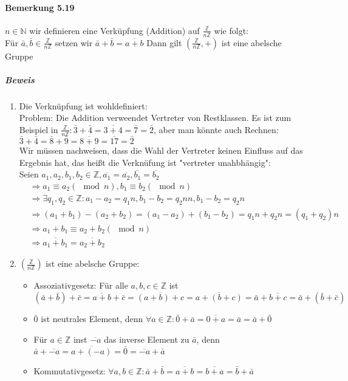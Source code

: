 \documentclass[a4paper]{scrartcl}
\DeclareMathOperator{\Forall}{\forall}
\begin{document}
\paragraph{Bemerkung 5.19}
\label{sec-3-1-7-4}
$n\in\mathbb{N}$ wir definieren eine Verküpfung (Addition) auf $\frac{\mathbb{Z}}{n\mathbb{Z}}$ wie folgt: \\
     Für $\bar a,\bar b \in\frac{\mathbb{Z}}{n\mathbb{Z}}$ setzen wir $\bar a + \bar b = \overline{a + b}$
Dann gilt $(\frac{\mathbb{Z}}{n\mathbb{Z}},+)$ ist eine abelsche Gruppe
\subparagraph{Beweis}
\label{sec-3-1-7-4-1}
\begin{enumerate}
\item Die Verknüpfung ist wohldefiniert: \\ Problem: Die Addition verweendet Vertreter von Restklassen. Es ist zum Beispiel in $\frac{\mathbb{Z}}{n\mathbb{Z}}: \bar 3 + \bar 4 = \overline{3 + 4} = \bar 7 = \bar 2$, aber man könnte auch Rechnen:
$\bar 3 + \bar 4 = \bar 8 + \bar 9 = \overline{8 + 9} = \overline{17} = \bar 2$ \\
         Wir müssen nachweisen, dass die Wahl der Vertreter keinen Einfluss auf das Ergebnis hat, das heißt die Verknüfung ist "vertreter unahbhängig": \\
         Seien $a_1,a_2 ,b_1,b_2 \in\mathbb{Z},\overline{a_1} = \overline{a_2},\overline{b_1} = \overline{b_2}$
\begin{align}
&\Rightarrow a_1 \equiv a_2(\mod n), b_1 \equiv b_2(\mod n) \\
&\Rightarrow\exists q_1,q_2\in\mathbb{Z}: a_1 - a_2 = q_1 n, b_1 - b_2 = q_2 n n, b_1 - b_2 = q_2 n \\
&\Rightarrow (a_1 + b_1) - (a_2 + b_2) = (a_1 - a_2)+ (b_1 - b_2) = q_1 n + q_2 n = (q_1 + q_2) n \\
&\Rightarrow a_1 + b_ 1 \equiv a_2 + b_2 (\mod n) \\
&\Rightarrow \overline{a_1 + b_1} = \overline{a_2 + b_2}
\end{align}
\item $(\frac{\mathbb{Z}}{n\mathbb{Z}})$ ist eine abelsche Gruppe:
\begin{itemize}
\item Assoziativgesetz: Für alle $a,b,c\in\mathbb{Z}$ ist
\[(\bar a + \bar b) + \bar c = \overline{a + b} + \bar c = \overline{(a + b) + c} = \overline{a + (b + c)} = \bar a + \overline{b + c} = \bar a + (\bar b + \bar c)\]
\item $\bar 0$ ist neutrales Element, denn $\Forall a\in\mathbb{Z}:\bar 0 + \bar a = \overline{0 + a} = \bar a = \bar a + \bar 0$
\item Für $a\in\mathbb{Z}$ inst $\overline{-a}$ das inverse Element zu $\bar a$, denn $\bar a + \overline{-a} = \overline{a + (- a)} = \bar 0 = \overline{-a} + \bar a$
\item Kommutativgesetz: $\Forall a,b\in\mathbb{Z}:\bar a + \bar b = \overline{a + b} = \overline{b + a} = \bar b + \bar a$
\end{itemize}
\end{enumerate}
\end{document}
